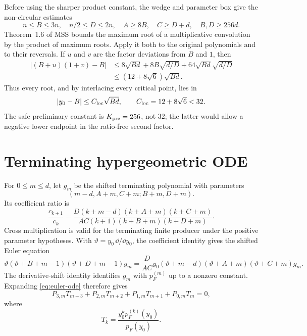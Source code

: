 \documentclass[12pt]{article}
\begin{document}
Before using the sharper product constant, the wedge and parameter box give
the non-circular estimates
\begin{equation}\label{eq:coarse-parameter}
 n\le B\le3n,\quad n/2\le D\le2n,\quad
 A\ge8B,\quad C\ge D+d,\quad B,D\ge256d.
\end{equation}
Theorem~1.6 of MSS bounds the maximum root of a multiplicative convolution
by the product of maximum roots.  Apply it both to the original polynomials
and to their reversals.  If $u$ and $v$ are the factor deviations from $B$
and $1$, then
\begin{align}
 |(B+u)(1+v)-B|
 &\le8\sqrt{Bd}+8B\sqrt{d/D}
       +64\sqrt{Bd}\sqrt{d/D}\nonumber\\
 &\le(12+8\sqrt6)\sqrt{Bd}.
 \label{eq:product-localization}
\end{align}
Thus every root, and by interlacing every critical point, lies in
\begin{equation}\label{eq:localization}
 |y_0-B|\le C_{\rm loc}\sqrt{Bd},\qquad
 C_{\rm loc}=12+8\sqrt6<32.
\end{equation}
The safe preliminary constant is $K_{\rm pre}=256$, not $32$; the latter
would allow a negative lower endpoint in the ratio-free second factor.

\section{Terminating hypergeometric ODE}\label{sec:ode}

For $0\le m\le d$, let $g_m$ be the shifted terminating polynomial with
parameters
\[
 (m-d,A+m,C+m;B+m,D+m).
\]
Its coefficient ratio is
\begin{equation}\label{eq:coefficient-ratio}
 \frac{c_{k+1}}{c_k}
 =\frac{D(k+m-d)(k+A+m)(k+C+m)}
 {AC(k+1)(k+B+m)(k+D+m)}.
\end{equation}
Cross multiplication is valid for the terminating finite producer under the
positive parameter hypotheses.  With $\vartheta=y_0\,\dd/\dd y_0$, the
coefficient identity gives the shifted Euler equation
\begin{equation}\label{eq:euler-ode}
 \vartheta(\vartheta+B+m-1)(\vartheta+D+m-1)g_m
 =\frac{D}{AC}y_0
 (\vartheta+m-d)(\vartheta+A+m)(\vartheta+C+m)g_m.
\end{equation}
The derivative-shift identity identifies $g_m$ with $p_F^{(m)}$ up to a
nonzero constant.  Expanding \eqref{eq:euler-ode} therefore gives
\begin{equation}\label{eq:four-term}
 P_{3,m}T_{m+3}+P_{2,m}T_{m+2}
 +P_{1,m}T_{m+1}+P_{0,m}T_m=0,
\end{equation}
where
\begin{equation}\label{eq:Tk}
 T_k=\frac{y_0^kp_F^{(k)}(y_0)}{p_F(y_0)}.
\end{equation}
\end{document}
